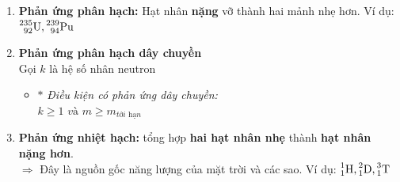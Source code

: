 \documentclass[a4paper,12pt,titlepage,twocolumn]{article}
\newenvironment{myitemize} 
{ \begin{itemize}[leftmargin=*,label=-]  %
		\setlength{\itemsep}{0pt}
		\setlength{\parskip}{0pt}
		\setlength{\parsep}{0pt}     }
{ \end{itemize}                  }
\newenvironment{myenumerate}
{ \begin{enumerate}[label=\textbf{\arabic*}.]
\setlist{nolistsep} %
\setlength{\itemsep}{0pt}
\setlength{\parskip}{0pt}
\setlength{\parsep}{0pt}	}
{ \end{enumerate}}
\begin{document}
\begin{myenumerate}
\begin{myitemize}
		\item Bảo toàn \textbf{điện tích Z}
		\item Bảo toàn \textbf{động lượng}
		\item Bảo toàn \textbf{năng lượng toàn phần}
	\end{myitemize}
	Năng lượng phản ứng: \\
	$\Delta E = (m_0-m) \cdot c^2 = W^{\prime}_{\textit{đ}} -  W_{\textit{đ}}$ \\ 
	$\text{\quad \phantom{a}} =(\Delta m_0- \Delta m) \cdot c^2$ \\
	$\Delta E>0$: Phản ứng \textbf{tỏa} năng lượng \\
	$\Delta E<0$: Phản ứng \textbf{thu} năng lượng \\
	Liên hệ động năng và động lượng: \\ 
	$W_{\textit{đ}} = \dfrac{mv^2}{2} = \dfrac{p^2}{2m}$
	\item \textbf{Phản ứng phân hạch:} Hạt nhân \textbf{nặng} vỡ thành {hai mảnh nhẹ hơn}. 
	Ví dụ: $\prescript{235}{92}{\text{U}}, \prescript{239}{94}{\text{Pu}}$
	\item \textbf{Phản ứng phân hạch dây chuyền} \\
	Gọi $k$ là hệ số nhân neutron
	\begin{myitemize}
		\item[$\ast$] \textit{Điều kiện có phản ứng dây chuyền:} \\
		$k \geqslant 1 \textit{ và } m \geqslant m_{\textit{tới hạn}}$
	\end{myitemize}
	\item \textbf{Phản ứng nhiệt hạch:} tổng hợp \textbf{hai hạt nhân nhẹ} thành \textbf{hạt nhân nặng hơn}. \\
	$\Rightarrow$ Đây là nguồn gốc năng lượng của mặt trời và các sao. Ví dụ: $\prescript{1}{1}{\text{H}}, \prescript{2}{1}{\text{D}},\prescript{3}{1}{\text{T}}$
\end{myenumerate}
\end{document}
